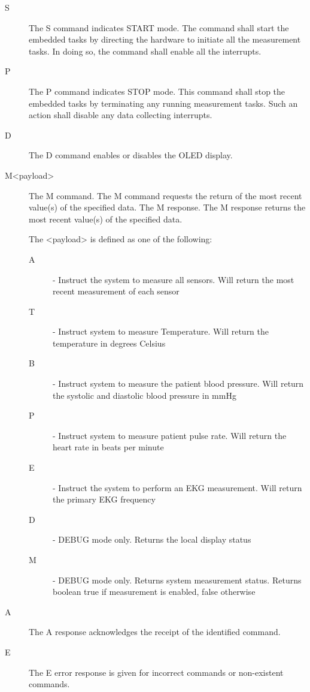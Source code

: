 \documentclass[12pt]{article} %
\begin{document}
		\begin{description}

			\item[S] 
				The S command indicates START mode. The command shall start the embedded 
				tasks by directing the hardware to initiate all the measurement tasks. In doing so, the 
				command shall enable all the interrupts. 

			\item[P] 
				The P command indicates STOP mode. This command shall stop the embedded tasks 
				by terminating any running measurement tasks. Such an action shall disable any data 
				collecting interrupts. 

			\item[D]
				The D command enables or disables the OLED display. 

			\item[M<payload>]
				The M command. The M command requests the return of the most recent value(s) of 
				the specified data. 
				The M response. The M response returns the most recent value(s) of the specified 
				data. 

				The <payload> is defined as one of the following:
				\begin{description}
					\item[A] - Instruct the system to measure all sensors. Will return the most recent measurement of each sensor
					\item[T] - Instruct system to measure Temperature. Will return the temperature in degrees Celsius
					\item[B] - Instruct system to measure the patient blood pressure. Will return the systolic and diastolic blood pressure in mmHg
					\item[P] - Instruct system to measure patient pulse rate. Will return the heart rate in beats per minute
					\item[E] - Instruct the system to perform an EKG measurement. Will return the primary EKG frequency
					\item[D] - DEBUG mode only. Returns the local display status
					\item[M] - DEBUG mode only. Returns system measurement status. Returns boolean true if measurement is enabled, false otherwise
				\end{description}

			\item[A]  
				The A response acknowledges the receipt of the identified command. 

			\item[E]
				The E error response is given for incorrect commands or non-existent commands.
		\end{description}
\end{document}
